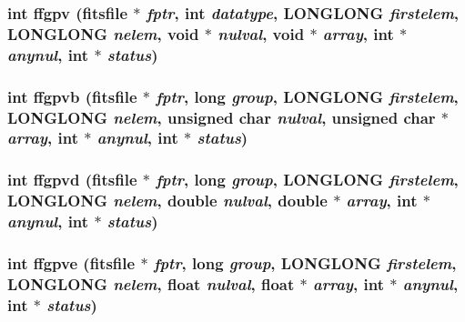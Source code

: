 \subsubsection{\setlength{\rightskip}{0pt plus 5cm}int ffgpv (\bf{fitsfile} $\ast$ {\em fptr}, int {\em datatype}, \bf{LONGLONG} {\em firstelem}, \bf{LONGLONG} {\em nelem}, void $\ast$ {\em nulval}, void $\ast$ {\em array}, int $\ast$ {\em anynul}, int $\ast$ {\em status})}\label{test_2shm__client_2fitsio_8h_0c3f5323e0fb6305fff345b94fb767e7}


\subsubsection{\setlength{\rightskip}{0pt plus 5cm}int ffgpvb (\bf{fitsfile} $\ast$ {\em fptr}, long {\em group}, \bf{LONGLONG} {\em firstelem}, \bf{LONGLONG} {\em nelem}, unsigned char {\em nulval}, unsigned char $\ast$ {\em array}, int $\ast$ {\em anynul}, int $\ast$ {\em status})}\label{test_2shm__client_2fitsio_8h_8e74e883f394026b322166c514e89737}


\subsubsection{\setlength{\rightskip}{0pt plus 5cm}int ffgpvd (\bf{fitsfile} $\ast$ {\em fptr}, long {\em group}, \bf{LONGLONG} {\em firstelem}, \bf{LONGLONG} {\em nelem}, double {\em nulval}, double $\ast$ {\em array}, int $\ast$ {\em anynul}, int $\ast$ {\em status})}\label{test_2shm__client_2fitsio_8h_360c62c59f25501d54be60fcc9d188a3}


\subsubsection{\setlength{\rightskip}{0pt plus 5cm}int ffgpve (\bf{fitsfile} $\ast$ {\em fptr}, long {\em group}, \bf{LONGLONG} {\em firstelem}, \bf{LONGLONG} {\em nelem}, float {\em nulval}, float $\ast$ {\em array}, int $\ast$ {\em anynul}, int $\ast$ {\em status})}\label{test_2shm__client_2fitsio_8h_aec726a6192a5cb163c2be7496ba41ff}


